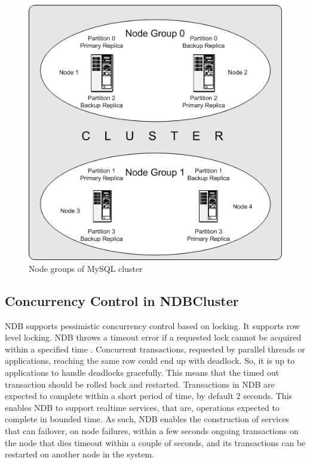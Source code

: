 \begin{figure}[h!]
\centering  
 \includegraphics[scale=0.4]{figs/preliminar/nodegroups.png}
  \caption{Node groups of MySQL cluster}
  \label{fig:nodegroups}
\end{figure}

\subsection{Concurrency Control in NDBCluster}
NDB  supports   pessimistic   concurrency   control  based  on  locking.  It  supports   row  level
locking.  NDB  throws   a timeout error if a requested lock  cannot be acquired within a specified
time \cite{mysql1}.  Concurrent  transactions,  requested  by   parallel  threads   or  applications,
reaching  the  same  row  could  end  up  with  deadlock.  So,  it  is   up  to  applications   to  handle
deadlocks   gracefully.  This   means   that  the  timed  out  transaction  should  be  rolled  back   and
restarted.  Transactions   in  NDB  are  expected  to  complete  within  a  short  period  of  time,  by
default  2  seconds.  This   enables   NDB  to  support  realtime  services,  that  are,  operations
expected  to  complete  in  bounded  time.  As   such,  NDB  enables   the  construction  of  services
that  can  failover,  on  node  failures,  within  a  few  seconds     ongoing transactions  on the node
that  dies  timeout within a couple of seconds, and its  transactions  can be restarted on another
node in the system.

